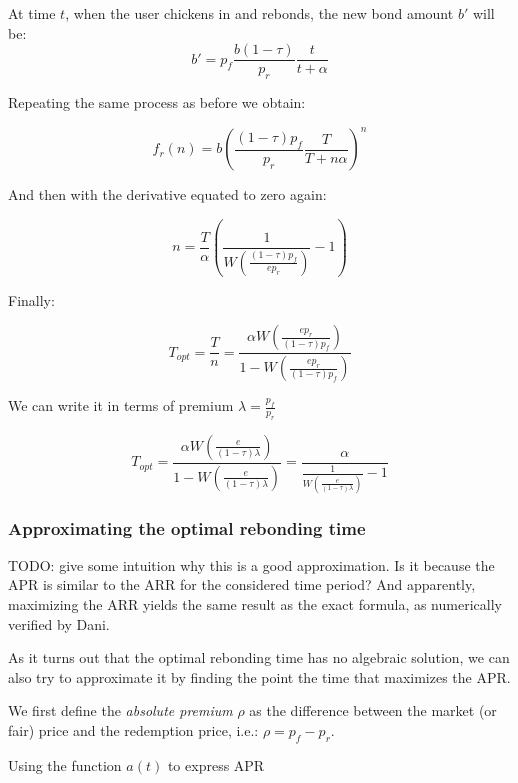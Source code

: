 \documentclass{article}
\begin{document}
At time $t$, when the user chickens in and rebonds, the new bond amount $b'$ will be:
\begin{equation}
b'= p_f\frac{b(1-\tau)}{p_r}\frac{t}{t+\alpha}
\end{equation}

Repeating the same process as before we obtain:

\begin{equation}
  \label{eq:n-rebond_3}
f_r(n) = b \left(\frac{(1-\tau)p_f}{p_r} \frac{T}{T+n \alpha} \right)^{n}
\end{equation}

And then with the derivative equated to zero again:

\[
n = \frac{T}{\alpha} \left(\frac{1}{W\left(\frac{(1-\tau)p_f}{e p_r} \right)} - 1\right)
\]

Finally:

\begin{equation}
  \label{}
T_{opt} = \frac{T}{n} = \frac{\alpha W\left(\frac{e p_r}{(1-\tau)p_f}\right)}{1 - W\left(\frac{e p_r}{(1-\tau)p_f}\right)}
\end{equation}

We can write it in terms of premium $\lambda = \frac{p_f}{p_r}$

\begin{equation}
  \label{eq:opt-rebonding}
T_{opt} = \frac{\alpha W\left(\frac{e}{(1-\tau)\lambda}\right)}{1 - W\left(\frac{e}{(1-\tau)\lambda}\right)} = \frac{\alpha}{\frac{1}{W\left(\frac{e}{(1-\tau)\lambda}\right)} - 1}
\end{equation}

\subsubsection{Approximating the optimal rebonding time}
TODO: give some intuition why this is a good approximation. Is it because the APR is similar to the ARR for the considered time period? And apparently, maximizing the ARR yields the same result as the exact formula, as numerically verified by Dani.

As it turns out that the optimal rebonding time has no algebraic solution, we can also try to approximate it by finding the point the time that maximizes the APR.

We first define the \textit{absolute premium} $\rho$ as the difference between the market (or fair) price and the redemption price, i.e.: $\rho = p_f - p_r$.

Using the function $a(t)$ to express APR
\end{document}
